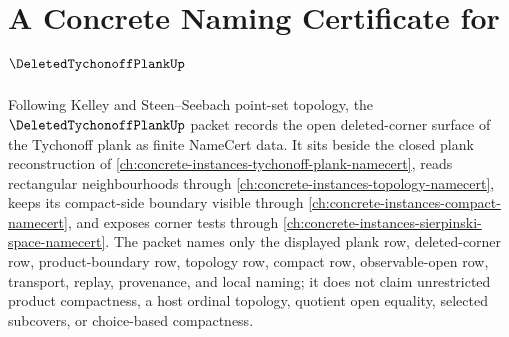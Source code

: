 \chapter{A Concrete Naming Certificate for $\DeletedTychonoffPlankUp$}
\label{ch:concrete-instances-deleted-tychonoff-plank-namecert}

Following Kelley and Steen--Seebach point-set topology, the $\DeletedTychonoffPlankUp$ packet records the open deleted-corner surface of the Tychonoff plank as finite NameCert data. It sits beside the closed plank reconstruction of \autoref{ch:concrete-instances-tychonoff-plank-namecert}, reads rectangular neighbourhoods through \autoref{ch:concrete-instances-topology-namecert}, keeps its compact-side boundary visible through \autoref{ch:concrete-instances-compact-namecert}, and exposes corner tests through \autoref{ch:concrete-instances-sierpinski-space-namecert}. The packet names only the displayed plank row, deleted-corner row, product-boundary row, topology row, compact row, observable-open row, transport, replay, provenance, and local naming; it does not claim unrestricted product compactness, a host ordinal topology, quotient open equality, selected subcovers, or choice-based compactness.

